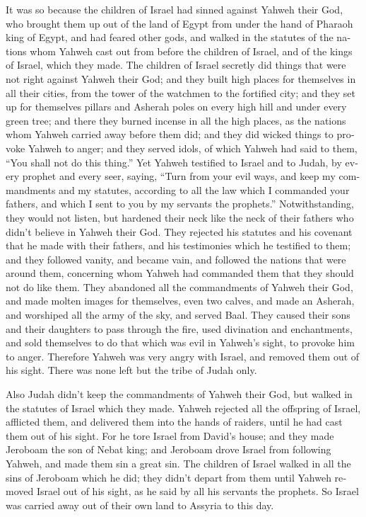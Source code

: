 \begin{paracol}{2}
\begin{otherlanguage}{english}
 It was so because the children of Israel had sinned
against Yahweh their God, who brought them up out of the land of Egypt
from under the hand of Pharaoh king of Egypt, and had feared other gods,
 and walked in the statutes of the nations whom Yahweh
cast out from before the children of Israel, and of the kings of Israel,
which they made.  The children of Israel secretly did
things that were not right against Yahweh their God; and they built high
places for themselves in all their cities, from the tower of the
watchmen to the fortified city;  and they set up for
themselves pillars and Asherah poles on every high hill and under every
green tree;  and there they burned incense in all the
high places, as the nations whom Yahweh carried away before them did;
and they did wicked things to provoke Yahweh to anger; 
and they served idols, of which Yahweh had said to them, ``You shall not
do this thing.''  Yet Yahweh testified to Israel and to
Judah, by every prophet and every seer, saying, ``Turn from your evil
ways, and keep my commandments and my statutes, according to all the law
which I commanded your fathers, and which I sent to you by my servants
the prophets.''  Notwithstanding, they would not listen,
but hardened their neck like the neck of their fathers who didn't
believe in Yahweh their God.  They rejected his statutes
and his covenant that he made with their fathers, and his testimonies
which he testified to them; and they followed vanity, and became vain,
and followed the nations that were around them, concerning whom Yahweh
had commanded them that they should not do like them. 
They abandoned all the commandments of Yahweh their God, and made molten
images for themselves, even two calves, and made an Asherah, and
worshiped all the army of the sky, and served Baal.  They
caused their sons and their daughters to pass through the fire, used
divination and enchantments, and sold themselves to do that which was
evil in Yahweh's sight, to provoke him to anger. 
Therefore Yahweh was very angry with Israel, and removed them out of his
sight. There was none left but the tribe of Judah only.

 Also Judah didn't keep the commandments of Yahweh their
God, but walked in the statutes of Israel which they made.
 Yahweh rejected all the offspring of Israel, afflicted
them, and delivered them into the hands of raiders, until he had cast
them out of his sight.  For he tore Israel from David's
house; and they made Jeroboam the son of Nebat king; and Jeroboam drove
Israel from following Yahweh, and made them sin a great sin.
 The children of Israel walked in all the sins of
Jeroboam which he did; they didn't depart from them 
until Yahweh removed Israel out of his sight, as he said by all his
servants the prophets. So Israel was carried away out of their own land
to Assyria to this day.


\end{otherlanguage}
\end{paracol}

